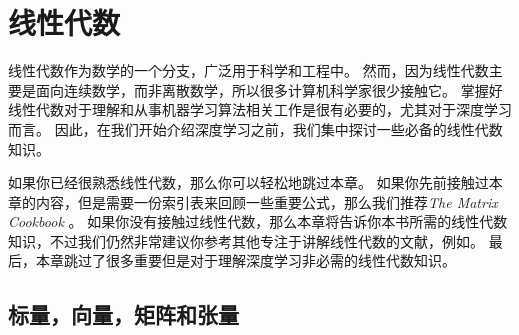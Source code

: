 \chapter{线性代数}
\label{chap:linear_algebra}

线性代数作为数学的一个分支，广泛用于科学和工程中。
然而，因为线性代数主要是面向连续数学，而非离散数学，所以很多计算机科学家很少接触它。
掌握好线性代数对于理解和从事机器学习算法相关工作是很有必要的，尤其对于深度学习而言。
因此，在我们开始介绍深度学习之前，我们集中探讨一些必备的线性代数知识。


如果你已经很熟悉线性代数，那么你可以轻松地跳过本章。
如果你先前接触过本章的内容，但是需要一份索引表来回顾一些重要公式，那么我们推荐\emph{The Matrix Cookbook} \citep{matrix-cookbook}。
如果你没有接触过线性代数，那么本章将告诉你本书所需的线性代数知识，不过我们仍然非常建议你参考其他专注于讲解线性代数的文献，例如\cite{shilov1977linear}。
最后，本章跳过了很多重要但是对于理解深度学习非必需的线性代数知识。




\section{标量，向量，矩阵和张量}
\label{sec:scalars_vectors_matrices_and_tensors}

